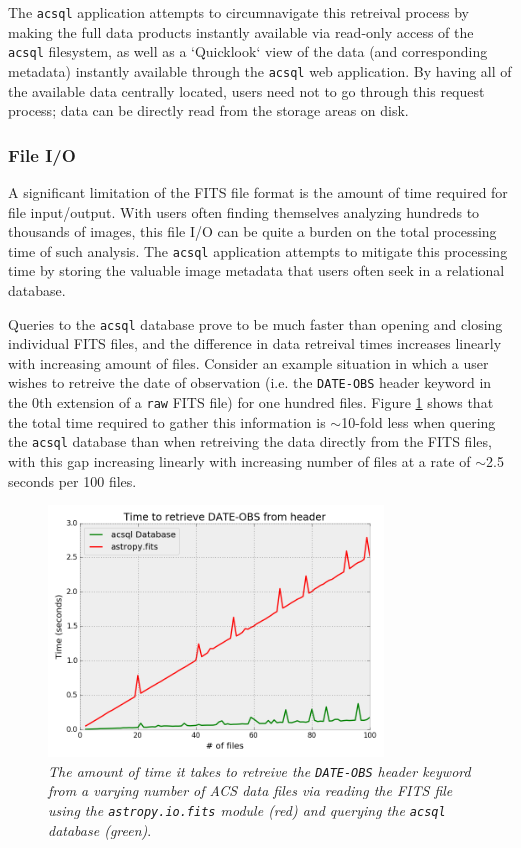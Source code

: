 \documentclass[10pt,journal,compsoc]{IEEEtran}
\begin{document}
The \texttt{acsql} application attempts to circumnavigate this retreival process by making the full data products instantly available via read-only access of
the \texttt{acsql} filesystem, as well as a `Quicklook` view of the data (and corresponding metadata) instantly available through the \texttt{acsql} web application.
By having all of the available data centrally located, users need not to go through this request process; data can be directly read from the storage areas on disk.


\subsubsection{File I/O} \label{sec1.3.2}

A significant limitation of the FITS file format is the amount of time required for file input/output.  With users often finding themselves analyzing hundreds to
thousands of images, this file I/O can be quite a burden on the total processing time of such analysis.  The \texttt{acsql} application attempts to mitigate this
processing time by storing the valuable image metadata that users often seek in a relational database.

Queries to the \texttt{acsql} database prove to be much faster than opening and closing individual FITS files, and the difference in data retreival times increases
linearly with increasing amount of files.  Consider an example situation in which a user wishes to retreive the date of observation (i.e. the \texttt{DATE-OBS} header
keyword in the 0th extension of a \texttt{raw} FITS file) for one hundred files. Figure \ref{fig3} shows that the total time required to gather this information
is $\sim$10-fold less when quering the \texttt{acsql} database than when retreiving the data directly from the FITS files, with this gap increasing linearly with
increasing number of files at a rate of $\sim$2.5 seconds per 100 files.

\begin{figure}[!h]
\centering
\includegraphics[width=3.5in]{./figures/fileio_time.png}
\caption{\textit{The amount of time it takes to retreive the \texttt{DATE-OBS} header keyword from a varying number of ACS data files via reading the FITS file using the
\texttt{astropy.io.fits} module (red) and querying the \texttt{acsql} database (green)}.}
\label{fig3}
\end{figure}
\end{document}
